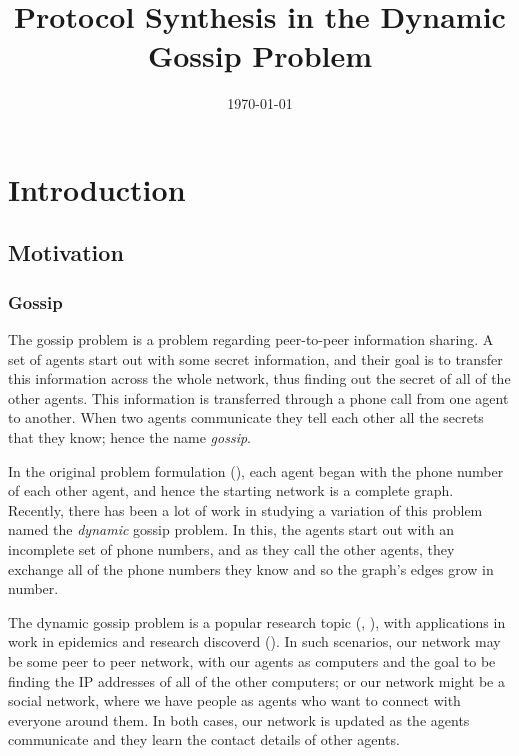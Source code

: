 \documentclass[12pt, a4paper]{article}
\title{Protocol Synthesis in the Dynamic Gossip Problem} %
\author{
	\authorstyle{Leo Poulson}
	\newline\newline %
}
\date{\today}
\begin{document}
\maketitle
\thispagestyle{firstpage}

\section{Introduction}

\subsection{Motivation}

\subsubsection{Gossip} 
The gossip problem is a problem regarding peer-to-peer information sharing. A
set of agents start out with some secret information, and their goal is to
transfer this information across the whole network, thus finding out the secret
of all of the other agents. This information is transferred through a phone call
from one agent to another. When two agents communicate they tell each other all
the secrets that they know; hence the name \textit{gossip}. %

In the original problem formulation (\cite{Tijdeman:1971}), each agent began
with the phone number of each other agent, and hence the starting network is a
complete graph. Recently, there has been a lot of work in studying a variation
of this problem named the \textit{dynamic} gossip problem. In this, the agents
start out with an incomplete set of phone numbers, and as they call the other
agents, they exchange all of the phone numbers they know and so the graph's
edges grow in number.

The dynamic gossip problem is a popular research topic (\cite{DynamicGossip},
\cite{EpProforDyGo}), with applications in work in epidemics and research
discoverd (\cite{DiscoverythruGossip}). In such scenarios, our network may be
some peer to peer network, with our agents as computers and the goal to be
finding the IP addresses of all of the other computers; or our network might be
a social network, where we have people as agents who want to connect with
everyone around them. In both cases, our network is updated as the agents
communicate and they learn the contact details of other agents. 
\end{document}
